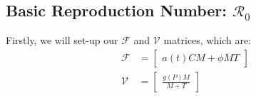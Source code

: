 \documentclass[12pt]{article}
\begin{document}
    \subsection{Basic Reproduction Number: $\mathscr{R}_0$}
        \label{appendix:A3}
        Firstly, we will set-up our $\mathscr{F}$ and $\mathscr{V}$ matrices, which are:
        \begin{align*}
            \mathscr{F} &= \begin{bmatrix}
                            a(t)CM + \phi MT
                          \end{bmatrix}\\
            \mathscr{V} &= \begin{bmatrix}
                            \frac{g(P)M}{M+T}
                          \end{bmatrix}              
        \end{align*}
        
\end{document}
